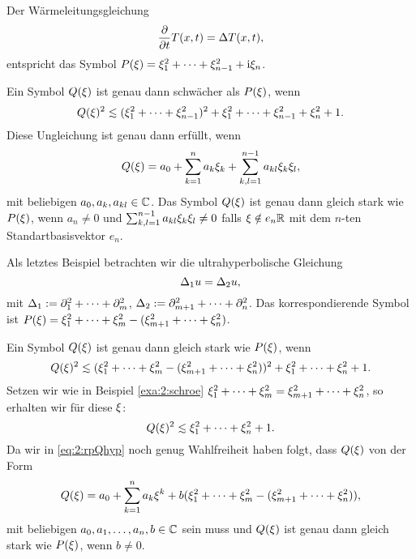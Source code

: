 \begin{exa}\label{exa:2:heat}
Der Wärmeleitungsgleichung
\begin{equation}
\frac{\partial}{\partial t}T(x,t)=\Delta T(x,t),
\end{equation}
entspricht das Symbol $P(\xi)=\xi^2_1+\dots+\xi^2_{n-1}+\mathrm i\xi_n$.

Ein Symbol $Q(\xi)$ ist genau dann schwächer als $P(\xi)$, wenn
\begin{equation}
Q(\x)^2\apprle(\x^2_1+\dots+\x^2_{n-1})^2+\x^2_1+\dots+\x^2_{n-1}+\x^2_n+1.
\end{equation}
Diese Ungleichung ist genau dann erfüllt, wenn
\begin{equation}
Q(\xi)=a_0+\sum_{k=1}^na_k\xi_k+\sum_{k,l=1}^{n-1}a_{kl}\xi_k\xi_l,
\end{equation}
mit beliebigen $a_0,a_k,a_{kl}\in\mathbb C$.
Das Symbol $Q(\xi)$ ist genau dann gleich stark wie $P(\xi)$,
wenn $a_n\neq0$ und $\sum_{k,l=1}^{n-1}a_{kl}\xi_k\xi_l\neq0$ falls $\xi\notin e_n\mathbb R$
mit dem $n$-ten Standartbasisvektor $e_n$.
\end{exa}

\begin{exa}\label{exa:2:hyper}
Als letztes Beispiel betrachten wir die ultrahyperbolische Gleichung
\begin{equation}
\Delta_1u=\Delta_2u,
\end{equation}
mit $\Delta_1:=\partial_1^2+\dots+\partial_m^2$, $\Delta_2:=\partial^2_{m+1}+\dots+\partial^2_n$.
Das korrespondierende Symbol ist $P(\xi)=\xi^2_1+\dots+\xi^2_m-(\xi^2_{m+1}+\dots+\xi^2_n)$.

Ein Symbol $Q(\xi)$ ist genau dann gleich stark wie $P(\xi)$,
wenn
\begin{equation}
Q(\x)^2\apprle(\x^2_1+\dots+\x^2_m-(\x^2_{m+1}+\dots+\x^2_n))^2+\x^2_1+\dots+\x^2_n+1.
\end{equation}
Setzen wir wie in Beispiel \ref{exa:2:schroe} $\xi^2_1+\dots+\xi^2_m=\xi^2_{m+1}+\dots+\xi^2_n$,
so erhalten wir für diese $\xi$:
\begin{equation}\label{eq:2:rpQhyp}
Q(\x)^2\apprle\x^2_1+\dots+\x^2_n+1.
\end{equation}
Da wir in \eqref{eq:2:rpQhyp} noch genug Wahlfreiheit haben folgt,
dass $Q(\xi)$ von der Form
\begin{equation}
Q(\xi)=a_0+\sum_{k=1}^na_k\xi^k+b(\xi_1^2+\dots+\xi^2_m-(\xi^2_{m+1}+\dots+\xi^2_n)),
\end{equation}
mit beliebigen $a_0,a_1,\dots,a_n,b\in\mathbb C$ sein muss
und $Q(\xi)$ ist genau dann gleich stark wie $P(\xi)$,
wenn $b\neq0$.
\end{exa}

